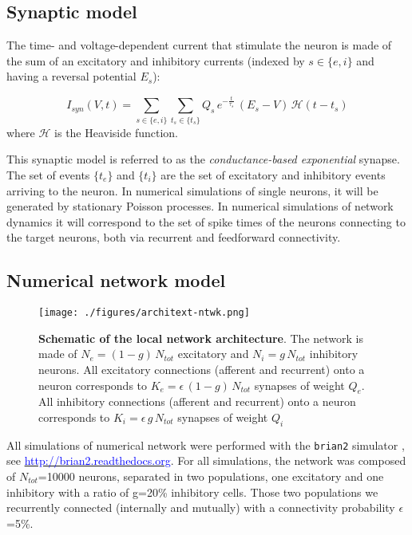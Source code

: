 \documentclass[8pt, colorlinks, a4paper]{article}
\renewcommand{\url}[1]{\underline{\textcolor{blue}{#1}}}
\begin{document}
\subsection{Synaptic model}
\label{sec-3-2}

The time- and voltage-dependent current that stimulate the neuron is
made of the sum of an excitatory and inhibitory currents (indexed by
\(s \in \{e,i\}\) and having a reversal potential \(E_s\)):

\begin{equation}
\label{eq:syn-current}
 I_{syn}(V,t) = \sum_{s \in \{e,i\}} \sum_{t_s \in \{t_s\}} Q_s \, e^{-\frac{t}{\tau_s}} \, (E_{s}-V) \, \mathcal{H}(t-t_s)
\end{equation}
where \(\mathcal{H}\) is the Heaviside function.

This synaptic model is referred to as the \emph{conductance-based
exponential} synapse. The set of events \(\{t_e\}\) and \(\{t_i\}\)
are the set of excitatory and inhibitory events arriving to the
neuron. In numerical simulations of single neurons, it will be
generated by stationary Poisson processes. In numerical simulations of
network dynamics it will correspond to the set of spike times of the
neurons connecting to the target neurons, both via recurrent and
feedforward connectivity.

\subsection{Numerical network model}
\label{sec-3-3}

\begin{figure}[tb!]
\centering
\texttt{[image: ./figures/architext-ntwk.png]}
\caption{\label{ntwk-architect}\textbf{Schematic of the local network architecture}. The network is made of \(N_e=(1-g) \, N_{tot}\) excitatory and \(N_i=g \, N_{tot}\) inhibitory neurons. All excitatory connections (afferent and recurrent) onto a neuron corresponds to \(K_e= \epsilon \, (1-g) \, N_{tot}\) synapses of weight \(Q_e\). All inhibitory connections (afferent and recurrent) onto a neuron corresponds to \(K_i= \epsilon \, g \, N_{tot}\) synapses of weight \(Q_i\)}
\end{figure}

All simulations of numerical network were performed with the \texttt{brian2}
simulator \cite{Goodman2009}, see \url{http://brian2.readthedocs.org}. For all
simulations, the network was composed of \(N_{tot}\)=10000 neurons,
separated in two populations, one excitatory and one inhibitory with a
ratio of g=20\% inhibitory cells. Those two populations we recurrently
connected (internally and mutually) with a connectivity probability
\(\epsilon\)=5\%.
\end{document}
